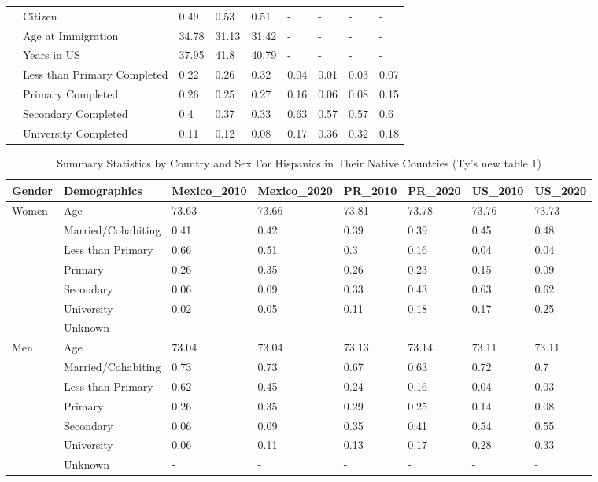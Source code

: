 \documentclass[
]{article}
\begin{document}
\begin{landscape}
\begin{table}[ht]
\begin{tabular}{l|l|p{1.5cm}p{1.5cm}p{1.5cm}p{1.5cm}p{1.5cm}p{1.5cm}p{1.5cm}}
   & Citizen & 0.49 & 0.53 & 0.51 & - & - & - & - \\ 
   & Age at Immigration & 34.78 & 31.13 & 31.42 & - & - & - & - \\ 
   & Years in US & 37.95 & 41.8 & 40.79 & - & - & - & - \\ 
   & Less than Primary Completed & 0.22 & 0.26 & 0.32 & 0.04 & 0.01 & 0.03 & 0.07 \\ 
   & Primary Completed & 0.26 & 0.25 & 0.27 & 0.16 & 0.06 & 0.08 & 0.15 \\ 
   & Secondary Completed & 0.4 & 0.37 & 0.33 & 0.63 & 0.57 & 0.57 & 0.6 \\ 
   & University Completed & 0.11 & 0.12 & 0.08 & 0.17 & 0.36 & 0.32 & 0.18 \\ 
   \hline
\end{tabular}
\endgroup
\end{table}


\begin{table}[ht]
\centering
\caption{Summary Statistics by Country and Sex For Hispanics in Their Native Countries  (Ty's new table 1)} 
\begin{tabular}{l|l|llllll}
  \hline
Gender & Demographics & Mexico\_2010 & Mexico\_2020 & PR\_2010 & PR\_2020 & US\_2010 & US\_2020 \\ 
  \hline
Women & Age & 73.63 & 73.66 & 73.81 & 73.78 & 73.76 & 73.73 \\ 
   & Married/Cohabiting & 0.41 & 0.42 & 0.39 & 0.39 & 0.45 & 0.48 \\ 
   & Less than Primary & 0.66 & 0.51 & 0.3 & 0.16 & 0.04 & 0.04 \\ 
   & Primary & 0.26 & 0.35 & 0.26 & 0.23 & 0.15 & 0.09 \\ 
   & Secondary & 0.06 & 0.09 & 0.33 & 0.43 & 0.63 & 0.62 \\ 
   & University & 0.02 & 0.05 & 0.11 & 0.18 & 0.17 & 0.25 \\ 
   & Unknown & - & - & - & - & - & - \\ 
  Men & Age & 73.04 & 73.04 & 73.13 & 73.14 & 73.11 & 73.11 \\ 
   & Married/Cohabiting & 0.73 & 0.73 & 0.67 & 0.63 & 0.72 & 0.7 \\ 
   & Less than Primary & 0.62 & 0.45 & 0.24 & 0.16 & 0.04 & 0.03 \\ 
   & Primary & 0.26 & 0.35 & 0.29 & 0.25 & 0.14 & 0.08 \\ 
   & Secondary & 0.06 & 0.09 & 0.35 & 0.41 & 0.54 & 0.55 \\ 
   & University & 0.06 & 0.11 & 0.13 & 0.17 & 0.28 & 0.33 \\ 
   & Unknown & - & - & - & - & - & - \\ 
   \hline
\end{tabular}
\end{table}

\end{landscape}
\end{document}
